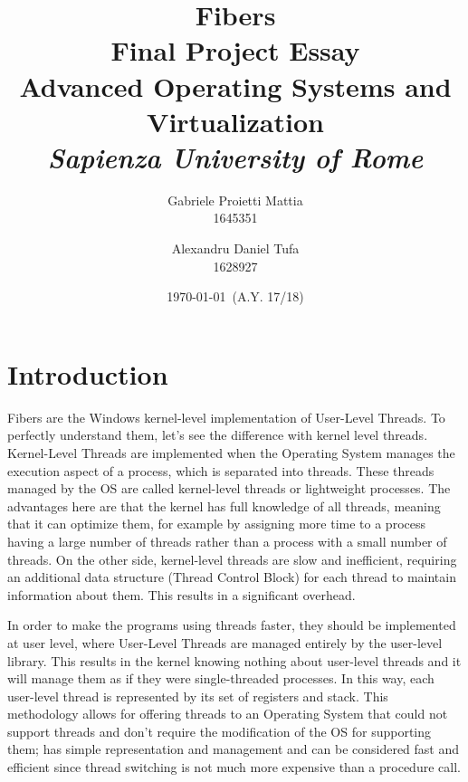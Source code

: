 \documentclass[a4paper,10pt]{article}
\title{
  \huge \textbf{Fibers} \\
  \Large Final Project Essay \\
  \large Advanced Operating Systems and Virtualization \\
  \large \textit{Sapienza University of Rome} 
}
\author{
  Gabriele Proietti Mattia \\ 1645351 \and Alexandru Daniel Tufa \\ 1628927
}
\date{\today\ (A.Y. 17/18)}
\begin{document}
\maketitle


\section{Introduction}
Fibers are the Windows kernel-level implementation of User-Level Threads. To perfectly understand them, let’s see the difference with kernel level threads. Kernel-Level Threads are implemented when the Operating System manages the execution aspect of a process, which is separated into threads. These threads managed by the OS are called kernel-level threads or lightweight processes. The advantages here are that the kernel has full knowledge of all threads, meaning that it can optimize them, for example by assigning more time to a process having a large number of threads rather than a process with a small number of threads. On the other side, kernel-level threads are slow and inefficient, requiring an additional data structure (Thread Control Block) for each thread to maintain information about them. This results in a significant overhead.

In order to make the programs using threads faster, they should be implemented at user level, where User-Level Threads are managed entirely by the user-level library. This results in the kernel knowing nothing about user-level threads and it will manage them as if they were single-threaded processes. In this way, each user-level thread is represented by its set of registers and stack. This methodology allows for offering threads to an Operating System that could not support threads and don’t require the modification of the OS for supporting them; has simple representation and management and can be considered fast and efficient since thread switching is not much more expensive than a procedure call.
\end{document}

